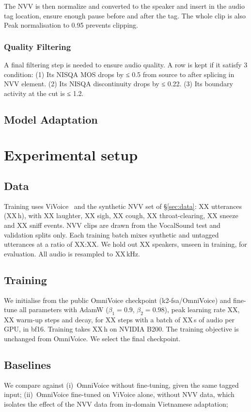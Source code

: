 \documentclass{article} %
\begin{document}
The NVV is then normalize and converted to the speaker and insert in the audio tag location, ensure enough pause before and after the tag. The  whole clip is also Peak normalisation to 0.95 prevents clipping.
\subsubsection{Quality Filtering}
A final filtering step is needed to ensure audio quality. A row is kept if it satisfy 3 condition: (1) Its NISQA MOS drops by ≤ 0.5 from source to after splicing in NVV element. (2) Its NISQA discontinuity drops by ≤ 0.22. (3) Its boundary activity at the cut is ≤ 1.2.

\subsection{Model Adaptation}

\section{Experimental setup}

\subsection{Data}
Training uses ViVoice~\cite{vivoice} and the
synthetic NVV set of \S\ref{sec:data}: XX utterances (XX\,h), with XX laughter, XX sigh, XX cough, XX throat-clearing, XX sneeze and XX sniff events. NVV clips are drawn from the VocalSound test and validation splits only. Each training batch mixes synthetic and untagged utterances at a ratio of XX:XX. We hold out XX speakers, unseen in training, for evaluation. All audio is resampled to XX\,kHz.

\subsection{Training}
We initialise from the public OmniVoice checkpoint (k2-fsa/OmniVoice) and fine-tune
all parameters with AdamW ($\beta_1{=}0.9$, $\beta_2{=}0.98$), peak learning rate XX, XX warm-up steps
and %
decay, for XX steps with a batch of XX\,s of audio per GPU, in bf16. Training takes XX\,h
on NVIDIA B200. The training objective is unchanged from OmniVoice. We select the final checkpoint.

\subsection{Baselines}
We compare against
(i)~OmniVoice without fine-tuning, given the same tagged input;
(ii)~OmniVoice fine-tuned on ViVoice alone, without NVV data, which isolates the effect of
the NVV data from in-domain Vietnamese adaptation;
\end{document}

